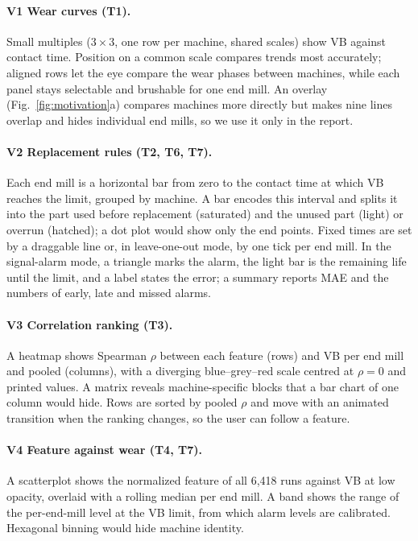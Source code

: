 \paragraph{V1 Wear curves (T1).}
Small multiples ($3\times3$, one row per machine, shared scales) show VB against contact time. Position on a
common scale compares trends most accurately; aligned rows let the eye compare the wear phases between
machines, while each panel stays selectable and brushable for one end mill. An overlay
(Fig.~\ref{fig:motivation}a) compares machines more directly but makes nine lines overlap and hides
individual end mills, so we use it only in the report.

\paragraph{V2 Replacement rules (T2, T6, T7).}
Each end mill is a horizontal bar from zero to the contact time at which VB reaches the limit, grouped by
machine. A bar encodes this interval and splits it into the part used before replacement (saturated) and the
unused part (light) or overrun (hatched); a dot plot would show only the end points. Fixed times are set by a
draggable line or, in leave-one-out mode, by one tick per end mill. In the signal-alarm mode, a triangle marks
the alarm, the light bar is the remaining life until the limit, and a label states the error; a summary reports
MAE and the numbers of early, late and missed alarms.

\paragraph{V3 Correlation ranking (T3).}
A heatmap shows Spearman $\rho$ between each feature (rows) and VB per end mill and pooled (columns),
with a diverging blue--grey--red scale centred at $\rho=0$ and printed values. A matrix reveals
machine-specific blocks that a bar chart of one column would hide. Rows are sorted by pooled $\rho$ and move
with an animated transition when the ranking changes, so the user can follow a feature.

\paragraph{V4 Feature against wear (T4, T7).}
A scatterplot shows the normalized feature of all 6,418 runs against VB at low opacity, overlaid with a
rolling median per end mill. A band shows the range of the per-end-mill level at the VB limit, from which
alarm levels are calibrated. Hexagonal binning would hide machine identity.

